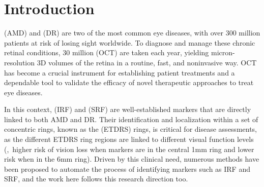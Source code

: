 \section{Introduction}
\label{sec:oct_introduction}
 (AMD) and  (DR) are two of the most common eye diseases, with over 300 million patients at risk of losing sight worldwide. To diagnose and manage these chronic retinal conditions, 30 million  (OCT) are taken each year, yielding micron-resolution 3D volumes of the retina in a routine, fast, and noninvasive way. OCT has become a crucial instrument for establishing patient treatments and a dependable tool to validate the efficacy of novel therapeutic approaches to treat eye diseases.

In this context,  (IRF) and  (SRF) are well-established markers that are directly linked to both AMD and DR. Their identification and localization within a set of concentric rings, known as the  (ETDRS) rings, is critical for disease assessments, as the different ETDRS ring regions are linked to different visual function levels (\ie,~higher risk of vision loss when markers are in the central 1mm ring and lower risk when in the 6mm ring). Driven by this clinical need, numerous methods have been proposed to automate the process of identifying markers such as IRF and SRF, and the work here follows this research direction too.



